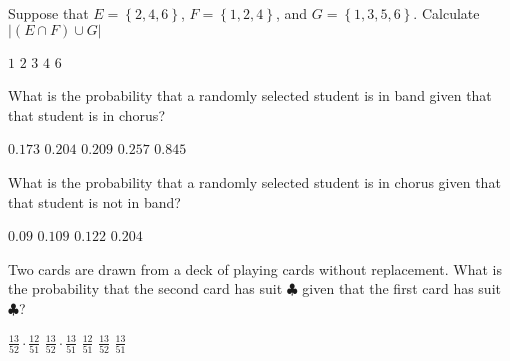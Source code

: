 \documentclass[answers,12pt]{exam}
\begin{document}
\begin{questions}
\question Suppose that $E=\left\{2,4,6\right\}$,
$F=\left\{1,2,4\right\}$, and $G=\left\{1,3,5,6\right\}$.
Calculate $\left|\left(E\cap F\right)\cup G\right|$\\
\begin{oneparchoices}
\choice $1$
\choice $2$
\choice $3$
\choice $4$
\correctchoice $6$
\end{oneparchoices}


\question\label{FirstAmes} What is the probability that a randomly selected
student is in band given that that student is in chorus?\\
\begin{oneparchoices}
\correctchoice $0.173$ 
\choice $0.204$ %
\choice $0.209$ %
\choice $0.257$ %
\choice $0.845$ %
\end{oneparchoices}

\question\label{LastAmes} What is the probability that a randomly selected
student is in chorus given that that student is not in band?\\
\begin{oneparchoices}
\choice $0.09$ %
\correctchoice $0.109$
\choice $0.122$ %
\choice %
\choice $0.204$ %
\end{oneparchoices}

\question Two cards are drawn from a deck of playing cards
without replacement. What is the probability that
the second card has suit $\clubsuit$ given that the
first card has suit $\clubsuit$?\\
\begin{oneparchoices}
\choice $\frac{13}{52}\cdot\frac{12}{51}$
\choice $\frac{13}{52}\cdot\frac{13}{51}$
\correctchoice $\frac{12}{51}$
\choice $\frac{13}{52}$
\choice $\frac{13}{51}$
\end{oneparchoices}

\end{questions}
\end{document}

